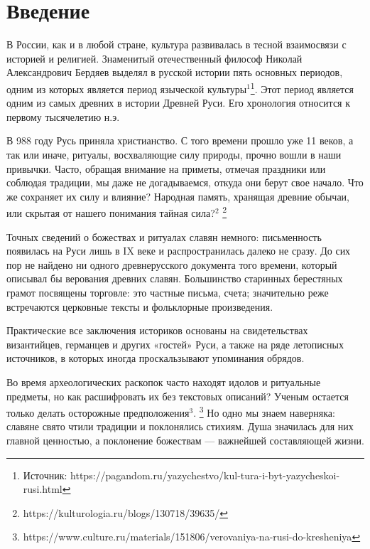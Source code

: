 \documentclass[a4paper, 12pt]{report}
\begin{document}
\setcounter{page}{2}
 
\newpage
     
    \tableofcontents %
\newpage
 
\newpage


\chapter*{Введение}

В России, как и в любой стране, культура развивалась в тесной взаимосвязи с историей и  религией. Знаменитый отечественный философ Николай Александрович Бердяев выделял в русской истории пять основных периодов, одним из которых является период языческой культуры$^1$\footnote{Источник: https://pagandom.ru/yazychestvo/kul-tura-i-byt-yazycheskoi-rusi.html}. Этот период является одним из самых древних в истории Древней Руси. Его хронология относится к первому тысячелетию н.э.




В 988 году Русь приняла христианство. С того времени прошло уже 11 веков, а так или иначе, ритуалы, восхваляющие силу природы, прочно вошли в наши привычки. Часто, обращая внимание на приметы, отмечая праздники или соблюдая традиции, мы даже не догадываемся, откуда они берут свое начало. Что же сохраняет их силу и влияние? Народная память, хранящая древние обычаи, или скрытая от нашего понимания тайная сила?$^2$ \footnote{https://kulturologia.ru/blogs/130718/39635/}

Точных сведений о божествах и ритуалах славян немного: письменность появилась на Руси лишь в IX веке и распространилась далеко не сразу. До сих пор не найдено ни одного древнерусского документа того времени, который описывал бы верования древних славян. Большинство старинных берестяных грамот посвящены торговле: это частные письма, счета; значительно реже встречаются церковные тексты и фольклорные произведения.
 
Практические все заключения историков основаны на свидетельствах византийцев, германцев и других «гостей» Руси, а также на ряде летописных источников, в которых иногда проскальзывают упоминания обрядов.

Во время археологических раскопок часто находят идолов и ритуальные предметы, но как расшифровать их без текстовых описаний? Ученым остается только делать осторожные предположения$^3$. \footnote{https://www.culture.ru/materials/151806/verovaniya-na-rusi-do-kresheniya} Но одно мы знаем наверняка: славяне свято чтили традиции и поклонялись стихиям. Душа значилась для них главной ценностью, а поклонение божествам — важнейшей составляющей жизни.
\end{document}
